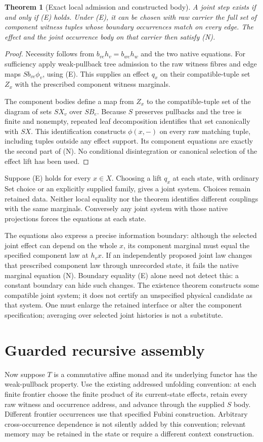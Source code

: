 \documentclass[11pt]{article}
\newtheorem{theorem}{Theorem}\newtheorem{proposition}{Proposition}
\begin{document}
\begin{theorem}[Exact local admission and constructed body]
A joint step exists if and only if (E) holds. Under (E), it can be chosen with raw carrier the full set of component witness tuples whose boundary occurrences match on every edge. The effect and the joint occurrence body on that carrier then satisfy (N).
\end{theorem}
\begin{proof}
Necessity follows from $b_{ve}h_v=b_{we}h_w$ and the two native equations. For sufficiency apply weak-pullback tree admission to the raw witness fibres and edge maps $Sb_{ve}\phi_v$, using (E). This supplies an effect $q_x$ on their compatible-tuple set $Z_x$ with the prescribed component witness marginals.

The component bodies define a map from $Z_x$ to the compatible-tuple set of the diagram of sets $SX_v$ over $SB_e$. Because $S$ preserves pullbacks and the tree is finite and nonempty, repeated leaf decomposition identifies that set canonically with $SX$. This identification constructs $\phi(x,-)$ on every raw matching tuple, including tuples outside any effect support. Its component equations are exactly the second part of (N). No conditional disintegration or canonical selection of the effect lift has been used.
\end{proof}

Suppose (E) holds for every $x\in X$. Choosing a lift $q_x$ at each state, with ordinary Set choice or an explicitly supplied family, gives a joint system. Choices remain retained data. Neither local equality nor the theorem identifies different couplings with the same marginals. Conversely any joint system with those native projections forces the equations at each state.

The equations also express a precise information boundary: although the selected joint effect can depend on the whole $x$, its component marginal must equal the specified component law at $h_vx$. If an independently proposed joint law changes that prescribed component law through unrecorded state, it fails the native marginal equation (N). Boundary equality (E) alone need not detect this: a constant boundary can hide such changes. The existence theorem constructs some compatible joint system; it does not certify an unspecified physical candidate as that system. One must enlarge the retained interface or alter the component specification; averaging over selected joint histories is not a substitute.

\section{Guarded recursive assembly}
Now suppose $T$ is a commutative affine monad and its underlying functor has the weak-pullback property. Use the existing addressed unfolding convention: at each finite frontier choose the finite product of its current-state effects, retain every raw witness and occurrence address, and advance through the supplied $S$ body. Different frontier occurrences use that specified Fubini construction. Arbitrary cross-occurrence dependence is not silently added by this convention; relevant memory may be retained in the state or require a different context construction.
\end{document}
